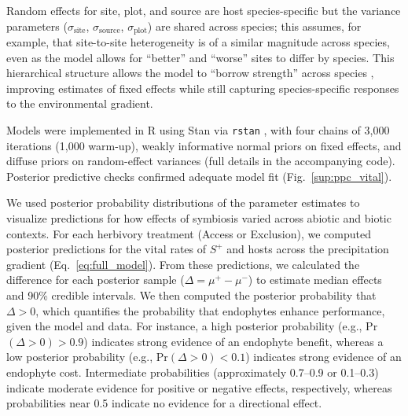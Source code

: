 \documentclass[12pt]{article}\usepackage[]{graphicx}\usepackage[dvipsnames]{xcolor}
\newcommand{\revise}[1]{{\color{Mahogany}{#1}}}
\begin{document}
Random effects for site, plot, and source are host species-specific but the variance parameters ($\sigma_{\text{site}}$, $\sigma_{\text{source}}$, $\sigma_{\text{plot}}$) are shared across species; this assumes, for example, that site-to-site heterogeneity is of a similar magnitude across species, even as the model allows for ``better'' and ``worse'' sites to differ by species. 
This hierarchical structure allows the model to ``borrow strength'' across species \citep{gelman2007data}, improving estimates of fixed effects while still capturing species-specific responses to the environmental gradient.

Models were implemented in R \citep{RCoreTeam} using Stan via \texttt{rstan} \citep{Rstan}, with four chains of 3,000 iterations (1,000 warm-up), weakly informative normal priors on fixed effects, and diffuse priors on random-effect variances (full details in the accompanying code). 
Posterior predictive checks confirmed adequate model fit (Fig.~\ref{sup:ppc_vital}).

We used posterior probability distributions of the parameter estimates to visualize predictions for how effects of symbiosis varied across abiotic and biotic contexts.
For each herbivory treatment (Access or Exclusion), we computed posterior predictions for the vital rates of $S^+$ and \revise{\linelabel{Sminus8}$S^-$} hosts across the precipitation gradient (Eq.~\ref{eq:full_model}).
From these predictions, we calculated the difference for each posterior sample ($\Delta = \mu^{+} - \mu^{-}$) to estimate median effects and 90\% credible intervals.
We then computed the posterior probability that $\Delta > 0$, which quantifies the probability that endophytes enhance performance, given the model and data.
For instance, a high posterior probability (e.g., Pr$(\Delta>0) >0.9$) indicates strong evidence of an endophyte benefit, whereas a low posterior probability (e.g., Pr$(\Delta>0) <0.1$) indicates strong evidence of an endophyte cost.
Intermediate probabilities (approximately 0.7--0.9 or 0.1--0.3) indicate moderate evidence for positive or negative effects, respectively, whereas probabilities near 0.5 indicate no evidence for a directional effect.
\end{document}
